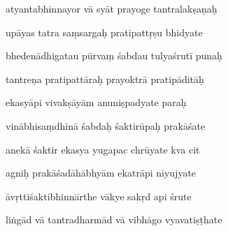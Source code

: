 \documentclass[article,12pt,a4paper]{memoir}%
\newcounter{parCount}
\begin{document}
	  
	  \pstart {} atyantabhinnayor vā syāt prayoge tantralakṣaṇaḥ 
	{}
	\pend%
      

	  
	  \pstart \leavevmode%
	upāyas tatra saṃsargaḥ pratipattṛṣu bhidyate 
	{}
	\pend%
      

	  
	  \pstart {} bhedenādhigatau pūrvaṃ śabdau tulyaśrutī punaḥ 
	{}
	\pend%
      

	  
	  \pstart \leavevmode%
	tantreṇa pratipattāraḥ prayoktrā pratipāditāḥ 
	{}
	\pend%
      

	  
	  \pstart {} ekasyāpi vivakṣāyām anuniṣpadyate paraḥ 
	{}
	\pend%
      

	  
	  \pstart \leavevmode%
	vinābhisaṃdhinā śabdaḥ śaktirūpaḥ prakāśate 
	{}
	\pend%
      

	  
	  \pstart {} anekā śaktir ekasya yugapac chrūyate kva cit 
	{}
	\pend%
      

	  
	  \pstart \leavevmode%
	agniḥ prakāśadāhābhyām ekatrāpi niyujyate 
	{}
	\pend%
      

	  
	  \pstart {} āvṛttiśaktibhinnārthe vākye sakṛd api śrute 
	{}
	\pend%
      

	  
	  \pstart \leavevmode%
	liṅgād vā tantradharmād vā vibhāgo vyavatiṣṭhate 
	{}
	\pend%
      
\end{document}
